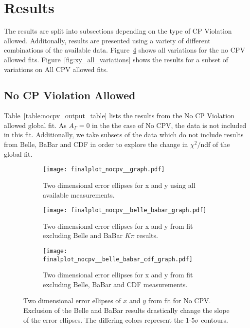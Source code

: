 \section{Results}
\label{sec:Results}
The results are split into subsections depending on the type of CP Violation allowed.
Additonally, results are presented using a variety of different combinations of the
available data. Figure~\ref{fig:xy_nocpv_variations} shows all variations for the 
no CPV allowed fits. Figure~\ref{fig:xy_all_variations} shows the results for a 
subset of variations on All CPV allowed fits. 
\subsection{No CP Violation Allowed}
Table~\ref{table:nocpv_output_table} lists the results from the No CP Violation allowed
global fit. As $A_\Gamma =0$ in the the case of No CPV, the data is not included in 
this fit. Additionally, we take subsets of the data which do not include results from
Belle, BaBar and CDF in order to explore the change in $\chi^2/$ndf of the global fit.

\begin{figure}[htb]
  \begin{center}
    \begin{subfigure}[b]{0.4\textwidth}
      \centering
      \texttt{[image: finalplot\_nocpv\_\_graph.pdf]}
      \caption{Two dimensional error ellipses for x and y using all available measurements.}
      \label{fig:xy_no_cpv_}
    \end{subfigure}%

    \begin{subfigure}[b]{0.4\textwidth}
      \centering
      \texttt{[image: finalplot\_nocpv\_\_belle\_babar\_graph.pdf]}
      \caption{Two dimensional error ellipses for x and y from fit excluding Belle and BaBar $K\pi$ results.}
      \label{fig:xy_no_cpv_nobelle_babar}
    \end{subfigure}%
    \hspace{2mm}
    \begin{subfigure}[b]{0.4\textwidth}
      \centering
      \texttt{[image: finalplot\_nocpv\_\_belle\_babar\_cdf\_graph.pdf]}
      \caption{Two dimensional error ellipses for x and y from fit excluding Belle, BaBar and CDF measurements.}
      \label{fig:xy_no_cpv_nocdf}
    \end{subfigure}%
  \end{center}
  \caption{Two dimensional error ellipses of $x$ and $y$ from fit for No CPV. Exclusion of the Belle and BaBar results drastically change the slope of the error ellipses. The differing colors represent the 1-5$\sigma$ contours.}
  \label{fig:xy_nocpv_variations}
\end{figure}
